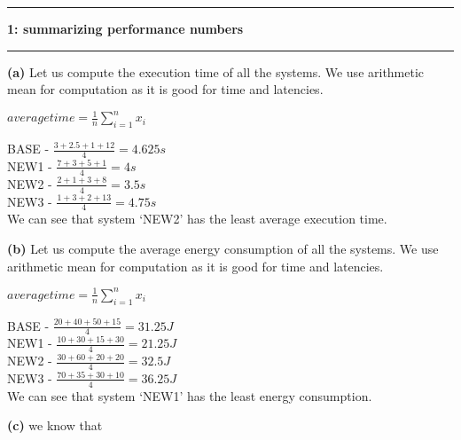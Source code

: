 \documentclass[11pt]{article}
\newcommand\question[2]{\vspace{.25in}\hrule\textbf{#1: #2}\vspace{.5em}\hrule\vspace{.10in}}
\renewcommand\part[1]{\vspace{.10in}\textbf{(#1)}}
\begin{document}
\raggedright
\newcommand\NAME{Vikas Kumar Rao}  %
\newcommand\UID{U1072596}     %
\newcommand\HWNUM{1}              %
\question{1}{summarizing performance numbers}
\part{a}
Let us compute the execution time of all the systems. We use arithmetic mean for computation as it is good for time and latencies.

$average time = \frac{1}{n}\sum\limits_{i=1}^n x_i$

BASE  - $\frac{3+2.5+1+12}{4} = 4.625s$\\
NEW1  - $\frac{7+3+5+1}{4} = 4s$\\
NEW2  - $\frac{2+1+3+8}{4} = 3.5s$\\
NEW3  - $\frac{1+3+2+13}{4} = 4.75s$\\

We can see that system `NEW2' has the least average execution time.

\part{b}
Let us compute the average energy consumption of all the systems. We use arithmetic mean for computation as it is good for time and latencies.

$average time = \frac{1}{n}\sum\limits_{i=1}^n x_i$

BASE  - $\frac{20+40+50+15}{4} = 31.25J$\\
NEW1  - $\frac{10+30+15+30}{4} = 21.25J$\\
NEW2  - $\frac{30+60+20+20}{4} = 32.5J$\\
NEW3  - $\frac{70+35+30+10}{4} = 36.25J$\\

We can see that system `NEW1' has the least energy consumption.

\part{c}
we know that 
\end{document}
